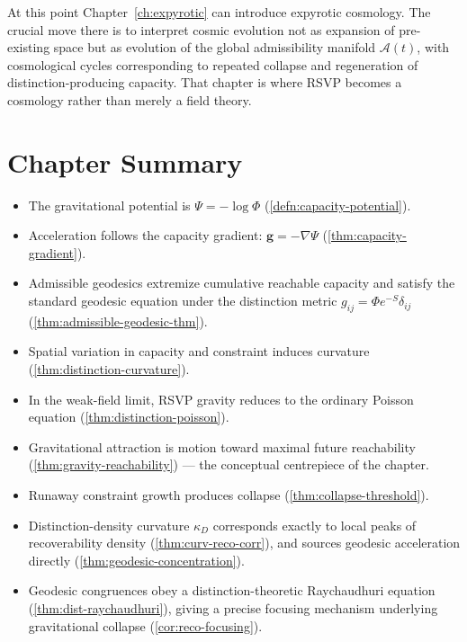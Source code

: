 \documentclass[12pt,twoside,openright]{book}
\newenvironment{chapsummary}{%
  \begin{tcolorbox}[colback=DistBlue!5,colframe=DistBlue,
    title={\faBookOpen\enspace Summary},
    fonttitle=\sffamily\bfseries\color{white},
    attach boxed title to top left={yshift=-2mm,xshift=4mm},
    boxed title style={colback=DistBlue,rounded corners}]
  \begin{itemize}[nosep,leftmargin=*]}{%
  \end{itemize}\end{tcolorbox}}
\begin{document}
At this point Chapter~\ref{ch:expyrotic} can introduce
expyrotic cosmology. The crucial move there is to
interpret cosmic evolution not as expansion of pre-existing
space but as evolution of the global admissibility
manifold $\mathcal{A}(t)$, with cosmological cycles
corresponding to repeated collapse and regeneration of
distinction-producing capacity. That chapter is where RSVP
becomes a cosmology rather than merely a field theory.

\section*{Chapter Summary}
\begin{chapsummary}
  \item The gravitational potential is
        $\Psi = -\log\Phi$ (\cref{defn:capacity-potential}).
  \item Acceleration follows the capacity gradient:
        $\mathbf{g} = -\nabla\Psi$
        (\cref{thm:capacity-gradient}).
  \item Admissible geodesics extremize cumulative reachable
        capacity and satisfy the standard geodesic equation
        under the distinction metric $g_{ij} = \Phi e^{-S}\delta_{ij}$
        (\cref{thm:admissible-geodesic-thm}).
  \item Spatial variation in capacity and constraint
        induces curvature (\cref{thm:distinction-curvature}).
  \item In the weak-field limit, RSVP gravity reduces to
        the ordinary Poisson equation
        (\cref{thm:distinction-poisson}).
  \item Gravitational attraction is motion toward maximal
        future reachability
        (\cref{thm:gravity-reachability}) ---
        the conceptual centrepiece of the chapter.
  \item Runaway constraint growth produces collapse
        (\cref{thm:collapse-threshold}).
  \item Distinction-density curvature $\kappa_D$
        corresponds exactly to local peaks of recoverability
        density (\cref{thm:curv-reco-corr}), and sources
        geodesic acceleration directly
        (\cref{thm:geodesic-concentration}).
  \item Geodesic congruences obey a distinction-theoretic
        Raychaudhuri equation
        (\cref{thm:dist-raychaudhuri}), giving a precise
        focusing mechanism underlying gravitational collapse
        (\cref{cor:reco-focusing}).
\end{chapsummary}
\end{document}
